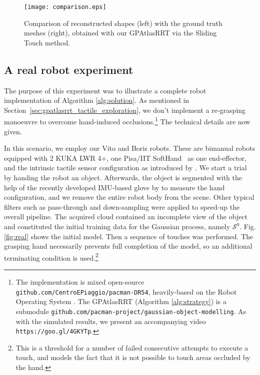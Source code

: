 \begin{figure}[htb]
    \centering
    \texttt{[image: comparison.eps]}
    \caption{Comparison of reconstructed shapes (left) with the ground truth meshes (right), obtained with our GPAtlasRRT via the Sliding Touch method.}
    \label{fig:shapecomp}
\end{figure}



\subsection{A real robot experiment}
\label{sec:real}

The purpose of this experiment was to illustrate a complete robot implementation of Algorithm \ref{alg:solution}. As mentioned in Section~\ref{sec:gpatlasrrt_tactile_exploration}, we don't implement a re-grasping manoeuvre to overcome hand-induced occlusions.\footnote{The implementation is mixed open-source \texttt{github.com/CentroEPiaggio/pacman-DR54}, heavily-based on the Robot Operating System \cite{ROS}. The GPAtlasRRT (Algorithm \ref{alg:strategy}) is a submodule \texttt{github.com/pacman-project/gaussian-object-modelling}. As with the simulated results, we present an accompanying video \texttt{https://goo.gl/4GKYTp}.} The technical details are now given.

In this scenario, we employ our Vito and Boris robots. These are bimanual robots equipped with 2 KUKA LWR 4+, one Pisa/IIT SoftHand~\cite{Catalano2014Adaptive} as one end-effector, and the intrinsic tactile sensor configuration as introduced by \cite{Rosales2014Active}. We start a trial by handing the robot an object. Afterwards, the object is segmented with the help of the recently developed IMU-based glove by \cite{Santaera2015Lowcost} to measure the hand configuration, and we remove the entire robot body from the scene. Other typical filters such as pass-through and down-sampling were applied to speed-up the overall pipeline. The acquired cloud contained an incomplete view of the object and constituted the initial training data for the Gaussian process, namely $\mathcal{S}^0$. Fig. \ref{fig:real} shows the initial model. Then a sequence of touches was performed. The grasping hand necessarily prevents full completion of the model, so an additional terminating condition is used.\footnote{This is a threshold for a number of failed consecutive attempts to execute a touch, and models the fact that it is not possible to touch areas occluded by the hand.} 

